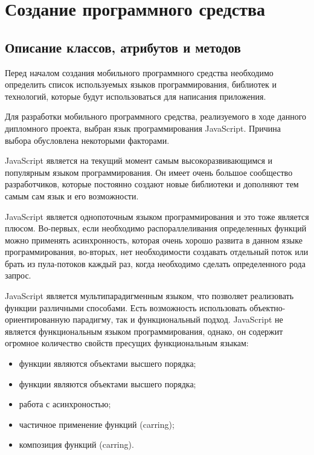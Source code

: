 \section{Создание программного средства} %
\label{sec:arch_and_mod}

\subsection{Описание классов, атрибутов и методов}
\label{sub:arch_and_mod:graphlib}

Перед началом создания мобильного программного средства необходимо определить список используемых языков программирования, библиотек и технологий, которые будут использоваться для написания приложения.

Для разработки мобильного программного средства, реализуемого в ходе данного дипломного проекта, выбран язык программирования JavaScript. Причина выбора обусловлена некоторыми факторами.

JavaScript является на текущий момент самым высокоразвивающимся и популярным языком программирования. Он имеет очень большое сообщество разработчиков, которые постоянно создают новые библиотеки и дополняют тем самым сам язык и его возможности.

JavaScript является однопоточным языком программирования и это тоже является плюсом. Во-первых, если необходимо распораллеливания определенных функций можно применять асинхронность, которая очень хорошо развита в данном языке программирования, во-вторых, нет необходимости создавать отдельный поток или брать из пула-потоков каждый раз, когда необходимо сделать определенного рода запрос.

JavaScript является мультипарадигменным языком, что позволяет реализовать функции различными способами. Есть возможность использовать объектно-ориентированную парадигму, так и функциональный подход. JavaScript не является функциональным языком программирования, однако, он содержит огромное количество свойств пресущих функциональным языкам:

\begin{itemize}
  \item функции являются объектами высшего порядка;
  \item функции являются объектами высшего порядка;
  \item работа с асинхроностью;
  \item частичное применение функций (carring);
  \item композиция функций (carring).
\end{itemize}


